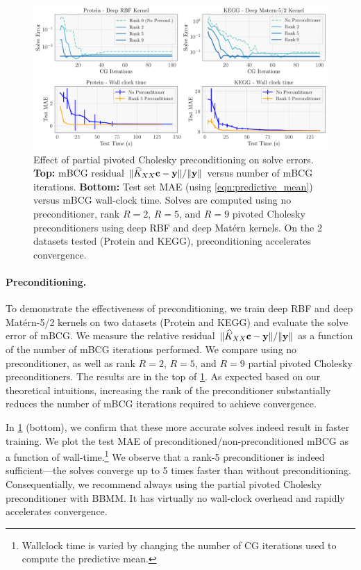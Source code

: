 \begin{figure}[t]
  \centering
  \includegraphics[width=\textwidth]{figures/precond_solves}
  \caption[Effect of partial pivoted Cholesky preconditioning on mBCG solve errors.]{
    Effect of partial pivoted Cholesky preconditioning on solve errors.
		{\bf Top:} mBCG residual $\Vert \widehat{K}_{XX} \mathbf{c} - \mathbf{y} \Vert / \Vert \mathbf{y} \Vert$ versus number of mBCG iterations.
		{\bf Bottom:} Test set MAE (using \cref{eqn:predictive_mean}) versus mBCG wall-clock time.
		Solves are computed using no preconditioner, rank $R=2$, $R=5$, and $R=9$ pivoted Cholesky preconditioners using deep RBF and deep Mat\'ern kernels.
		On the 2 datasets tested (Protein and KEGG), preconditioning accelerates convergence.
  }
  \label{fig:precond_results}
\end{figure}

\paragraph{Preconditioning.}
To demonstrate the effectiveness of preconditioning,
we train deep RBF and deep Mat\'ern-5/2 kernels on two datasets (Protein and KEGG) and evaluate the solve error of mBCG.
We measure the relative residual $\Vert \widehat{K}_{XX}\mathbf{c} - \mathbf{y} \Vert / \Vert \mathbf{y} \Vert$ as a function of the number of mBCG iterations performed.
We compare using no preconditioner, as well as rank $R=2$, $R=5$, and $R=9$ partial pivoted Cholesky preconditioners.
The results are in the top of \cref{fig:precond_results}.
As expected based on our theoretical intuitions, increasing the rank of the preconditioner substantially reduces the number of mBCG iterations required to achieve convergence.

In \cref{fig:precond_results} (bottom), we confirm that these more accurate solves indeed result in faster training.
We plot the test MAE of preconditioned/non-preconditioned mBCG as a function of wall-time.\footnote{
  Wallclock time is varied by changing the number of CG iterations used to compute the predictive mean.
}
We observe that a rank-5 preconditioner is indeed sufficient---the solves converge up to 5 times faster than without preconditioning.
Consequentially, we recommend always using the partial pivoted Cholesky preconditioner with BBMM.
It has virtually no wall-clock overhead and rapidly accelerates convergence.
